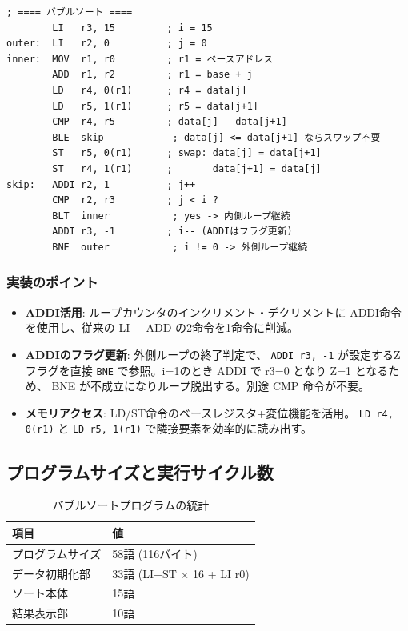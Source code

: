 \documentclass[a4paper,11pt]{ltjsarticle}
\begin{document}
\begin{lstlisting}[language={},caption={バブルソートプログラム (sort.asm) 抜粋 — ソート本体}]
; ==== バブルソート ====
        LI   r3, 15         ; i = 15
outer:  LI   r2, 0          ; j = 0
inner:  MOV  r1, r0         ; r1 = ベースアドレス
        ADD  r1, r2         ; r1 = base + j
        LD   r4, 0(r1)      ; r4 = data[j]
        LD   r5, 1(r1)      ; r5 = data[j+1]
        CMP  r4, r5         ; data[j] - data[j+1]
        BLE  skip            ; data[j] <= data[j+1] ならスワップ不要
        ST   r5, 0(r1)      ; swap: data[j] = data[j+1]
        ST   r4, 1(r1)      ;       data[j+1] = data[j]
skip:   ADDI r2, 1          ; j++
        CMP  r2, r3         ; j < i ?
        BLT  inner           ; yes -> 内側ループ継続
        ADDI r3, -1         ; i-- (ADDIはフラグ更新)
        BNE  outer           ; i != 0 -> 外側ループ継続
\end{lstlisting}

\subsubsection{実装のポイント}

\begin{itemize}
\item \textbf{ADDI活用}: ループカウンタのインクリメント・デクリメントに
  ADDI命令を使用し、従来の LI + ADD の2命令を1命令に削減。
\item \textbf{ADDIのフラグ更新}: 外側ループの終了判定で、
  \texttt{ADDI r3, -1} が設定するZフラグを直接
  \texttt{BNE} で参照。i=1のとき ADDI で r3=0 となり Z=1 となるため、
  BNE が不成立になりループ脱出する。別途 CMP 命令が不要。
\item \textbf{メモリアクセス}: LD/ST命令のベースレジスタ+変位機能を活用。
  \texttt{LD r4, 0(r1)} と \texttt{LD r5, 1(r1)} で隣接要素を効率的に読み出す。
\end{itemize}

\subsection{プログラムサイズと実行サイクル数}

\begin{table}[h]
\centering
\caption{バブルソートプログラムの統計}
\begin{tabular}{ll}
\toprule
項目 & 値 \\
\midrule
プログラムサイズ   & 58語 (116バイト) \\
データ初期化部     & 33語 (LI+ST $\times$ 16 + LI r0) \\
ソート本体         & 15語 \\
結果表示部         & 10語 \\
\bottomrule
\end{tabular}
\end{table}
\end{document}
